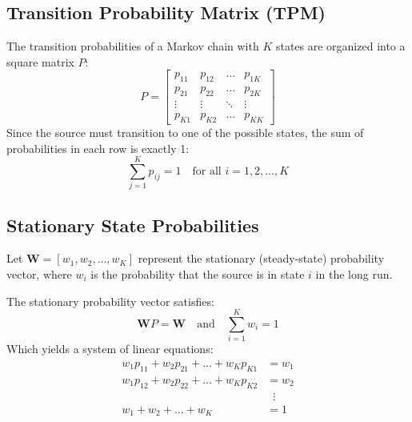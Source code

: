 \documentclass[12pt,a4paper]{article}
\begin{document}
\subsection{Transition Probability Matrix (TPM)}
The transition probabilities of a Markov chain with $K$ states are organized into a square matrix $P$:
\begin{equation}
  P = \begin{bmatrix}
    p_{11} & p_{12} & \dots & p_{1K} \\
    p_{21} & p_{22} & \dots & p_{2K} \\
    \vdots & \vdots & \ddots & \vdots \\
    p_{K1} & p_{K2} & \dots & p_{KK}
  \end{bmatrix}
\end{equation}
Since the source must transition to one of the possible states, the sum of probabilities in each row is exactly 1:
\begin{equation}
  \sum_{j=1}^K p_{ij} = 1 \quad \text{for all } i = 1, 2, \dots, K
\end{equation}

\subsection{Stationary State Probabilities}
Let $\mathbf{W} = [w_1, w_2, \dots, w_K]$ represent the stationary (steady-state) probability vector, where $w_i$ is the probability that the source is in state $i$ in the long run.
\begin{tcolorbox}[formulabox, title={\textbf{Stationary State Probability Equations}}]
The stationary probability vector satisfies:
\begin{equation}
  \mathbf{W} P = \mathbf{W} \quad \text{and} \quad \sum_{i=1}^K w_i = 1
\end{equation}
Which yields a system of linear equations:
\begin{align}
  w_1 p_{11} + w_2 p_{21} + \dots + w_K p_{K1} &= w_1 \\
  w_1 p_{12} + w_2 p_{22} + \dots + w_K p_{K2} &= w_2 \\
  &\;\; \vdots \\
  w_1 + w_2 + \dots + w_K &= 1
\end{align}
\end{tcolorbox}
\end{document}
